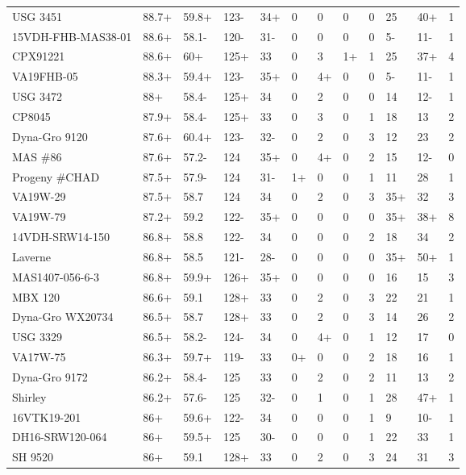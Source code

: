 \documentclass[12pt, letterpaper]{article}
\begin{document}
\begin{landscape}
\begin{ThreePartTable}
\begin{longtable}{llllllllllll}
  USG 3451 & 88.7+ & 59.8+ & 123- & 34+ & 0 & 0 & 0 & 0 & 25 & 40+ & 1 \\ 
  15VDH-FHB-MAS38-01 & 88.6+ & 58.1- & 120- & 31- & 0 & 0 & 0 & 0 & 5- & 11- & 1 \\ 
  CPX91221 & 88.6+ & 60+ & 125+ & 33 & 0 & 3 & 1+ & 1 & 25 & 37+ & 4 \\ 
  VA19FHB-05 & 88.3+ & 59.4+ & 123- & 35+ & 0 & 4+ & 0 & 0 & 5- & 11- & 1 \\ 
  USG 3472 & 88+ & 58.4- & 125+ & 34 & 0 & 2 & 0 & 0 & 14 & 12- & 1 \\ 
  CP8045 & 87.9+ & 58.4- & 125+ & 33 & 0 & 3 & 0 & 1 & 18 & 13 & 2 \\ 
  Dyna-Gro 9120 & 87.6+ & 60.4+ & 123- & 32- & 0 & 2 & 0 & 3 & 12 & 23 & 2 \\ 
  MAS \#86 & 87.6+ & 57.2- & 124 & 35+ & 0 & 4+ & 0 & 2 & 15 & 12- & 0 \\ 
  Progeny \#CHAD & 87.5+ & 57.9- & 124 & 31- & 1+ & 0 & 0 & 1 & 11 & 28 & 1 \\ 
  VA19W-29 & 87.5+ & 58.7 & 124 & 34 & 0 & 2 & 0 & 3 & 35+ & 32 & 3 \\ 
  VA19W-79 & 87.2+ & 59.2 & 122- & 35+ & 0 & 0 & 0 & 0 & 35+ & 38+ & 8 \\ 
  14VDH-SRW14-150 & 86.8+ & 58.8 & 122- & 34 & 0 & 0 & 0 & 2 & 18 & 34 & 2 \\ 
  Laverne & 86.8+ & 58.5 & 121- & 28- & 0 & 0 & 0 & 0 & 35+ & 50+ & 1 \\ 
  MAS1407-056-6-3 & 86.8+ & 59.9+ & 126+ & 35+ & 0 & 0 & 0 & 0 & 16 & 15 & 3 \\ 
  MBX 120 & 86.6+ & 59.1 & 128+ & 33 & 0 & 2 & 0 & 3 & 22 & 21 & 1 \\ 
  Dyna-Gro WX20734 & 86.5+ & 58.7 & 128+ & 33 & 0 & 2 & 0 & 3 & 14 & 26 & 2 \\ 
  USG 3329 & 86.5+ & 58.2- & 124- & 34 & 0 & 4+ & 0 & 1 & 12 & 17 & 0 \\ 
  VA17W-75 & 86.3+ & 59.7+ & 119- & 33 & 0+ & 0 & 0 & 2 & 18 & 16 & 1 \\ 
  Dyna-Gro 9172 & 86.2+ & 58.4- & 125 & 33 & 0 & 2 & 0 & 2 & 11 & 13 & 2 \\ 
  Shirley & 86.2+ & 57.6- & 125 & 32- & 0 & 1 & 0 & 1 & 28 & 47+ & 1 \\ 
  16VTK19-201 & 86+ & 59.6+ & 122- & 34 & 0 & 0 & 0 & 1 & 9 & 10- & 1 \\ 
  DH16-SRW120-064 & 86+ & 59.5+ & 125 & 30- & 0 & 0 & 0 & 1 & 22 & 33 & 1 \\ 
  SH 9520 & 86+ & 59.1 & 128+ & 33 & 0 & 2 & 0 & 3 & 24 & 31 & 3 \\ 

\end{longtable}
\end{ThreePartTable}
\end{landscape}
\end{document}
